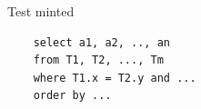 \documentclass[french]{beamer}
\begin{document}
\begin{frame}[fragile]{Test minted}

\begin{verbatim}
    select a1, a2, .., an
    from T1, T2, ..., Tm
    where T1.x = T2.y and ... 
    order by ...
\end{verbatim}
\end{frame}
\end{document}
